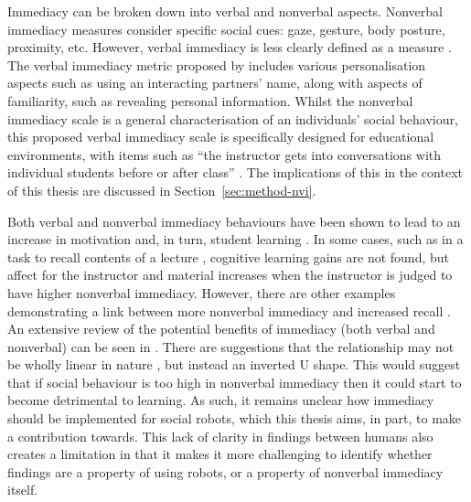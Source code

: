 Immediacy can be broken down into verbal and nonverbal aspects. Nonverbal immediacy measures consider specific social cues: gaze, gesture, body posture, proximity, etc. However, verbal immediacy is less clearly defined as a measure \citep{robinson1995validity}. The verbal immediacy metric proposed by \citet{gorham1988relationship} includes various personalisation aspects such as using an interacting partners' name, along with aspects of familiarity, such as revealing personal information. Whilst the nonverbal immediacy scale is a general characterisation of an individuals' social behaviour, this proposed verbal immediacy scale is specifically designed for educational environments, with items such as ``the instructor gets into conversations with individual students before or after class'' \citep{gorham1988relationship}. The implications of this in the context of this thesis are discussed in Section~\ref{sec:method-nvi}.

Both verbal and nonverbal immediacy behaviours have been shown to lead to an increase in motivation and, in turn, student learning \citep{christensen1998linear, christophel1990relationships}. In some cases, such as in a task to recall contents of a lecture \citep{chesebro2003effects}, cognitive learning gains are not found, but affect for the instructor and material increases when the instructor is judged to have higher nonverbal immediacy. However, there are other examples demonstrating a link between more nonverbal immediacy and increased recall \citep{goodboy2009effects, witt2001experimental}. An extensive review of the potential benefits of immediacy (both verbal and nonverbal) can be seen in \citet{chesebro1998relationship}. There are suggestions that the relationship may not be wholly linear in nature \citep{comstock1995food, witt2006influence}, but instead an inverted U shape. This would suggest that if social behaviour is too high in nonverbal immediacy then it could start to become detrimental to learning. As such, it remains unclear how immediacy should be implemented for social robots, which this thesis aims, in part, to make a contribution towards. This lack of clarity in findings between humans also creates a limitation in that it makes it more challenging to identify whether findings are a property of using robots, or a property of nonverbal immediacy itself.

